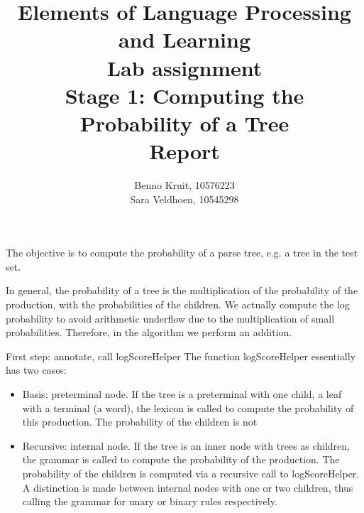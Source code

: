\documentclass{article}
\title{Elements of Language Processing and Learning\\
Lab assignment \\
Stage 1: Computing the Probability of a Tree\\
Report}
\author{Benno Kruit, 10576223\\Sara Veldhoen, 10545298}
\begin{document}
\maketitle

The objective is to compute the probability of a parse tree, e.g. a tree in the test set. 


In general, the probability of a tree is the multiplication of the probability of the production, with the probabilities of the children. We actually compute the log probability to avoid arithmetic underflow due to the multiplication of small probabilities. Therefore, in the algorithm we perform an addition.
\begin{figure}

\end{figure}

First step: annotate, call logScoreHelper
The function logScoreHelper essentially has two cases:\begin{itemize}
\item Basis: preterminal node. If the tree is a preterminal with one child, a leaf with a terminal (a word), the lexicon is called to compute the probability of this production. The probability of the children is not 
\item Recursive: internal node. If the tree is an inner node with trees as children, the grammar is called to compute the probability of the production. The probability of the children is computed via a recursive call to logScoreHelper.
A distinction is made between internal nodes with one or two children, thus calling the grammar for unary or binary rules respectively.
\end{itemize}
\end{document}
